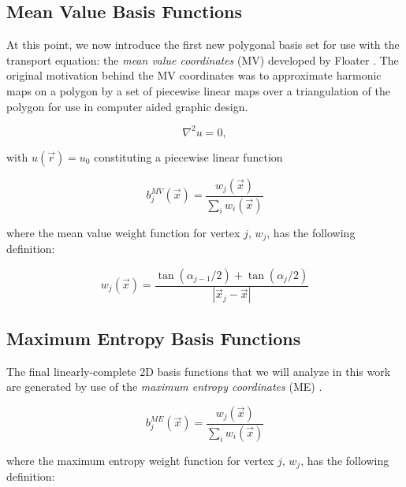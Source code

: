 \subsection{Mean Value Basis Functions}
\label{sec::BF_2DLinear_MV}

At this point, we now introduce the first new polygonal basis set for use with the transport equation: the {\em mean value coordinates} (MV) developed by Floater \cite{floater2003mean,hormann2006mean}. The original motivation behind the MV coordinates was to approximate harmonic maps on a polygon by a set of piecewise linear maps over a triangulation of the polygon for use in computer aided graphic design.

\begin{equation}
\label{eq::BF_MV_laplace}
\nabla^2 u = 0 ,
\end{equation}

\noindent with $u(\vec{r}) = u_0$ constituting a piecewise linear function 

\begin{equation}
\label{eq::BF_MV_BF}
b_{j}^{MV} (\vec{x}) = \frac{w_j (\vec{x}) }{\sum_i w_i (\vec{x})}
\end{equation}

\noindent where the mean value weight function for vertex $j$, $w_j$, has the following definition:

\begin{equation}
\label{eq::BF_MV_weights}
w_j (\vec{x})  = \frac{\tan(\alpha_{j-1} / 2) + \tan(\alpha_j / 2)}{|\vec{x}_j - \vec{x}|}
\end{equation}

\subsection{Maximum Entropy Basis Functions}
\label{sec::BF_2DLinear_ME}

The final linearly-complete 2D basis functions that we will analyze in this work are generated by use of the {\em maximum entropy coordinates} (ME) \cite{sukumar2004construction,hormann2008maximum}. 

\begin{equation}
\label{eq::BF_ME_BF}
b_{j}^{ME} (\vec{x}) = \frac{w_j (\vec{x}) }{\sum_i w_i (\vec{x})}
\end{equation}

\noindent where the maximum entropy weight function for vertex $j$, $w_j$, has the following definition:

